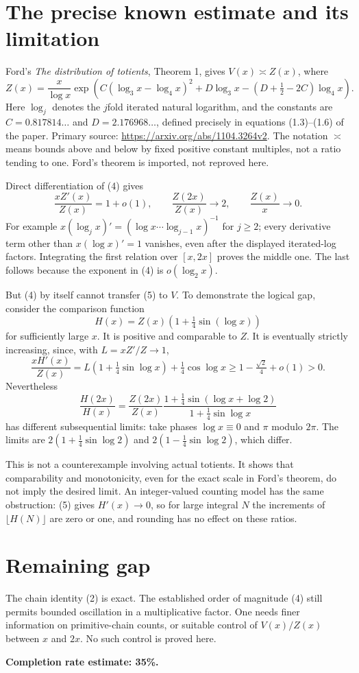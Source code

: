 \documentclass[11pt]{article}
\begin{document}
\section*{The precise known estimate and its limitation}
Ford's \emph{The distribution of totients}, Theorem 1, gives $V(x)\asymp Z(x)$, where
\[
 Z(x)=\frac{x}{\log x}
 \exp\!\left(C(\log_3 x-\log_4 x)^2+D\log_3 x
 -(D+\tfrac12-2C)\log_4 x\right). \tag{4}
\]
Here $\log_j$ denotes the $j$fold iterated natural logarithm, and the constants are $C=0.817814\ldots$ and $D=2.176968\ldots$, defined precisely in equations (1.3)--(1.6) of the paper. Primary source: \url{https://arxiv.org/abs/1104.3264v2}. The notation $\asymp$ means bounds above and below by fixed positive constant multiples, not a ratio tending to one. Ford's theorem is imported, not reproved here.

Direct differentiation of (4) gives
\[
 \frac{xZ'(x)}{Z(x)}=1+o(1),\qquad
 \frac{Z(2x)}{Z(x)}\to2,
 \qquad \frac{Z(x)}x\to0. \tag{5}
\]
For example $x(\log_j x)'=(\log x\cdots\log_{j-1}x)^{-1}$ for $j\ge2$; every derivative term other than $x(\log x)'=1$ vanishes, even after the displayed iterated-log factors. Integrating the first relation over $[x,2x]$ proves the middle one. The last follows because the exponent in (4) is $o(\log_2 x)$.

But (4) by itself cannot transfer (5) to $V$. To demonstrate the logical gap, consider the comparison function
\[
 H(x)=Z(x)\left(1+\tfrac14\sin(\log x)\right)
\]
for sufficiently large $x$. It is positive and comparable to $Z$. It is eventually strictly increasing, since, with $L=xZ'/Z\to1$,
\[
 \frac{xH'(x)}{Z(x)}
 =L\left(1+\tfrac14\sin\log x\right)
       +\tfrac14\cos\log x
 \ge1-\tfrac{\sqrt2}{4}+o(1)>0.
\]
Nevertheless
\[
 \frac{H(2x)}{H(x)}
 =\frac{Z(2x)}{Z(x)}
   \frac{1+\tfrac14\sin(\log x+\log2)}
        {1+\tfrac14\sin\log x}
\]
has different subsequential limits: take phases $\log x\equiv0$ and $\pi$ modulo $2\pi$. The limits are $2(1+\tfrac14\sin\log2)$ and $2(1-\tfrac14\sin\log2)$, which differ.

This is not a counterexample involving actual totients. It shows that comparability and monotonicity, even for the exact scale in Ford's theorem, do not imply the desired limit. An integer-valued counting model has the same obstruction: (5) gives $H'(x)\to0$, so for large integral $N$ the increments of $\lfloor H(N)\rfloor$ are zero or one, and rounding has no effect on these ratios.

\section*{Remaining gap}
The chain identity (2) is exact. The established order of magnitude (4) still permits bounded oscillation in a multiplicative factor. One needs finer information on primitive-chain counts, or suitable control of $V(x)/Z(x)$ between $x$ and $2x$. No such control is proved here.

\textbf{Completion rate estimate: 35\%.}
\end{document}
